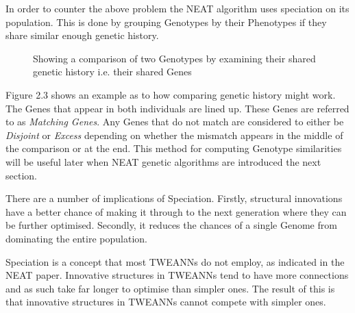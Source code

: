 \documentclass[]{Learning-to-Play-Wolfenstein-thesis}
\begin{document}
In order to counter the above problem the NEAT algorithm uses speciation on its population. This is done by grouping Genotypes by their Phenotypes if they share similar enough genetic history. 

\begin{figure}[h]
\centering
\fboxsep 2mm
\caption{\label{fig:NEAT_innovation} Showing a comparison of two Genotypes by examining their shared genetic history i.e. their shared Genes}
\end{figure} 

Figure 2.3 shows an example as to how comparing genetic history might work. The Genes that appear in both individuals are lined up. These Genes are referred to as \textit{Matching Genes}. Any Genes that do not match are considered to either be \textit{Disjoint} or \textit{Excess} depending on whether the mismatch appears in the middle of the comparison or at the end. This method for computing Genotype similarities will be useful later when NEAT genetic algorithms are introduced the next section. ~\cite{NEAT:speciation}

There are a number of implications of Speciation. Firstly, structural innovations have a better chance of making it through to the next generation where they can be further optimised. Secondly, it reduces the chances of a single Genome from dominating the entire population. 

Speciation is a concept that most TWEANNs do not employ, as indicated in the NEAT paper. Innovative structures in TWEANNs tend to have more connections and as such take far longer to optimise than simpler ones. The result of this is that innovative structures in TWEANNs cannot compete with simpler ones.
\end{document}
